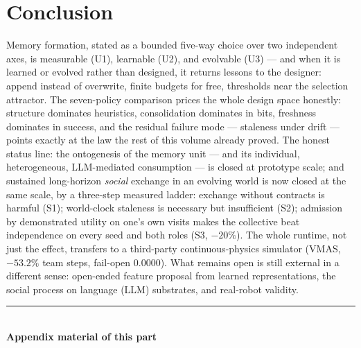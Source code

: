 \documentclass{article}
\begin{document}
\section{Conclusion}

Memory formation, stated as a bounded five-way choice over two
independent axes, is measurable (U1), learnable (U2), and evolvable
(U3) --- and when it is learned or evolved rather than designed, it
returns lessons to the designer: append instead of overwrite, finite
budgets for free, thresholds near the selection attractor. The
seven-policy comparison prices the whole design space honestly:
structure dominates heuristics, consolidation dominates in bits,
freshness dominates in success, and the residual failure mode ---
staleness under drift --- points exactly at the law the rest of this
volume already proved. The honest status line: the ontogenesis of the
memory unit --- and its individual, heterogeneous, LLM-mediated
consumption --- is closed at prototype scale; and sustained long-horizon
\emph{social} exchange in an evolving world is now closed at the same
scale, by a three-step measured ladder: exchange without contracts is
harmful (S1); world-clock staleness is necessary but insufficient
(S2); admission by demonstrated utility on one's own visits makes the
collective beat independence on every seed and both roles (S3,
$-20\%$). The whole runtime, not just the effect, transfers to a
third-party continuous-physics simulator (VMAS, $-53.2\%$ team steps,
fail-open $0.0000$). What remains open is still external in a
different sense: open-ended feature proposal from learned
representations, the social process on language (LLM) substrates, and
real-robot validity.



\FloatBarrier
\begin{center}\rule{0.55\linewidth}{0.4pt}\\[2pt]\textbf{Appendix material of this part}\end{center}
\end{document}
